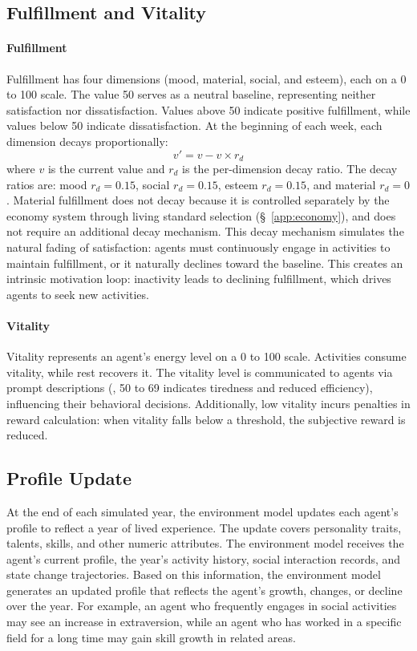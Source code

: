\subsection{Fulfillment and Vitality}
\label{sec:appendix_states}

\paragraph{Fulfillment}
Fulfillment has four dimensions (mood, material, social, and esteem), each on a 0 to 100 scale.
The value 50 serves as a neutral baseline, representing neither satisfaction nor dissatisfaction.
Values above 50 indicate positive fulfillment, while values below 50 indicate dissatisfaction.
At the beginning of each week, each dimension decays proportionally:
\begin{equation}
v' = v - v \times r_d
\end{equation}
where $v$ is the current value and $r_d$ is the per-dimension decay ratio.
The decay ratios are: mood $r_d = 0.15$, social $r_d = 0.15$, esteem $r_d = 0.15$, and material $r_d = 0$.
Material fulfillment does not decay because it is controlled separately by the economy system through living standard selection (\S~\ref{app:economy}), and does not require an additional decay mechanism.
This decay mechanism simulates the natural fading of satisfaction: agents must continuously engage in activities to maintain fulfillment, or it naturally declines toward the baseline.
This creates an intrinsic motivation loop: inactivity leads to declining fulfillment, which drives agents to seek new activities.

\paragraph{Vitality}
Vitality represents an agent's energy level on a 0 to 100 scale.
Activities consume vitality, while rest recovers it.
The vitality level is communicated to agents via prompt descriptions (\eg, 50 to 69 indicates tiredness and reduced efficiency), influencing their behavioral decisions.
Additionally, low vitality incurs penalties in reward calculation: when vitality falls below a threshold, the subjective reward is reduced.

\subsection{Profile Update}
\label{sec:appendix_profile_update}

At the end of each simulated year, the environment model updates each agent's profile to reflect a year of lived experience.
The update covers personality traits, talents, skills, and other numeric attributes.
The environment model receives the agent's current profile, the year's activity history, social interaction records, and state change trajectories.
Based on this information, the environment model generates an updated profile that reflects the agent's growth, changes, or decline over the year.
For example, an agent who frequently engages in social activities may see an increase in extraversion, while an agent who has worked in a specific field for a long time may gain skill growth in related areas.


